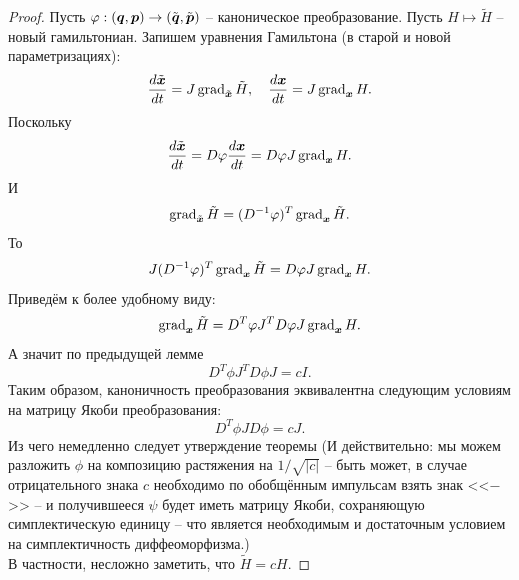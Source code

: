 \begin{proof}
    Пусть $\varphi: (\boldsymbol{q}, \boldsymbol{p}) \to (\tilde{\boldsymbol{q}}, \tilde{\boldsymbol{p}})$ -- каноническое преобразование.
    Пусть $H \mapsto \tilde{H}$ -- новый гамильтониан.
    Запишем уравнения Гамильтона (в старой и новой параметризациях):
    \[
        \dfrac{d\tilde{\boldsymbol{x}}}{dt} = J \operatorname{grad}_{\tilde{\boldsymbol{x}}} \tilde{H}, \quad \dfrac{d \boldsymbol{x}}{dt} = J\operatorname{grad}_{\boldsymbol{x}} H.
    \]
    Поскольку
    \[
        \dfrac{d \tilde{\boldsymbol{x}}}{dt} = D\varphi \dfrac{d\boldsymbol{x}}{dt} = D\varphi J \operatorname{grad}_{\boldsymbol{x}} H.
    \]
    И
    \[
        \operatorname{grad}_{\tilde{\boldsymbol{x}}} \tilde{H} = (D^{-1}\varphi)^T \operatorname{grad}_{\boldsymbol{x}} \tilde{H}.
    \]
    То
    \[
        J(D^{-1} \varphi)^T \operatorname{grad}_{\boldsymbol{x}} \tilde{H} = D\varphi J \operatorname{grad}_{\boldsymbol{x}} H.
    \]
    Приведём к более удобному виду:
    \[
        \operatorname{grad}_{\boldsymbol{x}}\tilde{H} = D^T\varphi J^T D\varphi J \operatorname{grad}_{\boldsymbol{x}} H.
    \]
    А значит по предыдущей лемме
    \[
        D^T \phi J^T D\phi J = cI.
    \]
    Таким образом, каноничность преобразования эквивалентна следующим условиям на матрицу Якоби преобразования:
    \[
        D^T \phi J D\phi = cJ.
    \]
    Из чего немедленно следует утверждение теоремы (И действительно: мы можем разложить $\phi$ на композицию растяжения на $1/\sqrt{|c|}$ -- быть может, в случае отрицательного знака $c$ необходимо по обобщённым импульсам взять знак <<$-$>> -- и получившееся $\psi$ будет иметь матрицу Якоби, сохраняющую симплектическую единицу -- что является необходимым и достаточным условием на симплектичность диффеоморфизма.) \\
    В частности, несложно заметить, что $\tilde{H} = cH$.
\end{proof}
